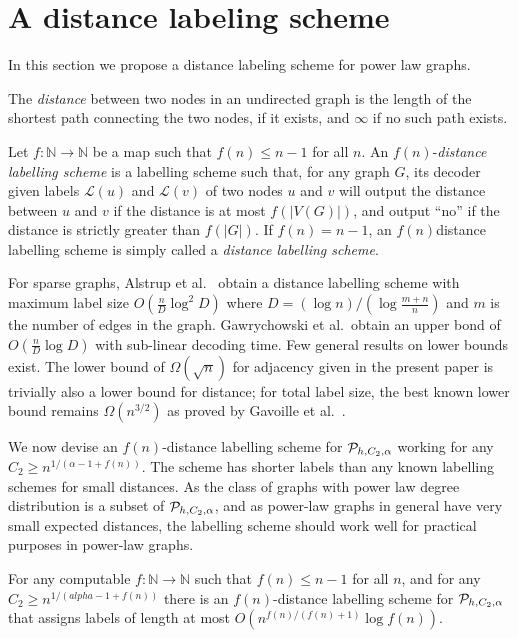 \section{A distance labeling scheme}\label{Sec:Distance}
In this section we propose a distance labeling scheme for power law graphs. 

The \emph{distance} between two nodes in an undirected graph is the length of the shortest path connecting
the two nodes, if it exists, and $\infty$ if no such path exists.

Let $f : \mathbb{N} \longrightarrow \mathbb{N}$ be a map such that
$f(n) \leq  n -1$ for all $n$. An $f(n)$-\emph{distance labelling scheme} is a labelling
scheme such that, for any graph $G$, its decoder given labels $\mathcal{L}(u)$ and $\mathcal{L}(v)$ of two nodes $u$ and $v$
will output the distance between $u$ and $v$ if the distance is at most $f(\vert V(G) \vert)$, and output ``no'' if the distance
is  strictly greater than $f(\vert G \vert)$. If $f(n) = n-1$,
an $f(n)$distance labelling scheme is simply called a \emph{distance labelling scheme}.

For sparse graphs,
Alstrup et al.\ \cite{DBLP:journals/corr/AlstrupDKP15} obtain a distance labelling scheme with maximum label size
$O(\frac{n}{D} \log^2 D)$ where $D = (\log n)/(\log \frac{m+n}{n})$ and $m$ is the number of edges
in the graph.   Gawrychowski et al.\ obtain an upper bond of \cite{DBLP:journals/corr/GawrychowskiKU15}
$O(\frac{n}{D} \log D)$ with sub-linear decoding time. Few general results on lower bounds exist. The lower bound of $\Omega(\sqrt{n})$ for adjacency given in the present paper is trivially also a lower bound for distance; for total label size, the best known lower bound remains $\Omega(n^{3/2})$ as proved by Gavoille et al.~\cite{Gavoille2001}.

We now devise an $f(n)$-distance labelling scheme for $ \mathcal{P}_{h,C_2,\alpha}$ working for any $C_2 \geq n^{1/(\alpha - 1 +f(n))}$.
The scheme has shorter labels than any known labelling schemes for small distances. As
the class of graphs with power law degree distribution is a subset of $ \mathcal{P}_{h,C_2,\alpha}$, and as power-law graphs in general
have very small expected distances, the labelling scheme should work well for practical purposes in power-law graphs.

\begin{lemma}\label{lem:sparse_small_dist}
For any computable $f : \mathbb{N} \longrightarrow \mathbb{N}$ such that
$f(n) \leq n -1$ for all $n$, and for any $C_2 \geq n^{1/(alpha-1+f(n))}$ there is an $f(n)$-distance labelling scheme for $ \mathcal{P}_{h,C_2,\alpha}$
that assigns labels of length at most $O(n^{f(n)/(f(n) + 1)} \log f(n))$.
\end{lemma}

